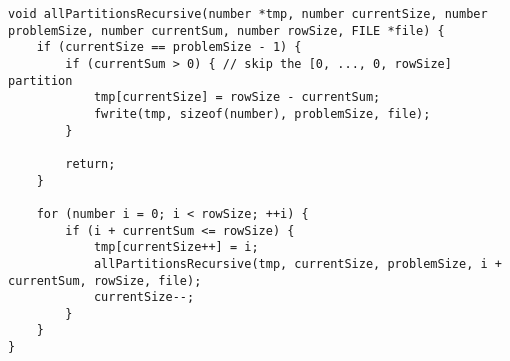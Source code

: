 \begin{lstlisting}[caption={Recursively computing all partitions of a number $n$ and permutations thereof with a certain size.},label={allPartitionsRecursive}]
void allPartitionsRecursive(number *tmp, number currentSize, number problemSize, number currentSum, number rowSize, FILE *file) {
    if (currentSize == problemSize - 1) {
        if (currentSum > 0) { // skip the [0, ..., 0, rowSize] partition
            tmp[currentSize] = rowSize - currentSum;
            fwrite(tmp, sizeof(number), problemSize, file);
        }

        return;
    }

    for (number i = 0; i < rowSize; ++i) {
        if (i + currentSum <= rowSize) {
            tmp[currentSize++] = i;
            allPartitionsRecursive(tmp, currentSize, problemSize, i + currentSum, rowSize, file);
            currentSize--;
        }
    }
}
\end{lstlisting}

